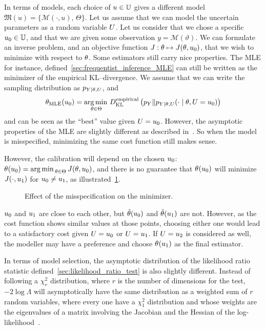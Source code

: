 \documentclass[../../Main_ManuscritThese.tex]{subfiles}
\newcommand\imgpath{/home/victor/acadwriting/Manuscrit/Text/Chapter2/img/}
\begin{document}
In terms of models, each choice of $\uu \in \Uspace$ gives a different model $\mathfrak{M}(u) = \{\mathcal{M}(\cdot, u),\,\Theta\}$. Let us assume that we can model the uncertain parameters as a random variable $\UU$.
Let us consider that we chose a specific $\uu_0 \in \Uspace$, and that we are given some observation $y=\mathscr{M}(\vartheta)$. We can formulate an inverse problem, and an objective function $J:\kk \mapsto J(\kk,\uu_0)$, that we wish to minimize with respect to $\kk$.
Some estimators still carry nice properties. The MLE for instance, defined~\cref{sec:frequentist_inference_MLE} can still be written as the minimizer of the empirical KL--divergence. We assume that we can write the sampling distribution as $p_{Y \mid \KK, \UU}$, and
\begin{equation}
  \estimtxt{\theta}{MLE}(\uu_0)=  \argmin_{\kk \in \Kspace}\DKL[empirical]{p_Y}{p_{Y \mid \theta, \UU}(\cdot \mid \theta, \UU=\uu_0)}
\end{equation}
and can be seen as the ``best'' value given $\UU=\uu_0$. However, the asymptotic properties of the MLE are slightly different as described in~\cite{white_maximum_1982}.
So when the model is misspecified, minimizing the same cost function still makes sense.

However, the calibration will depend on the chosen $\uu_0$: $\estimtxt{\theta}{}(\uu_0) = \argmin_{\theta \in \Theta} J(\theta,\uu_0)$, and there is no guarantee that $\estimtxt{\theta}{}(\uu_0)$ will minimize $J(\cdot, \uu_1)$ for $\uu_0 \neq \uu_1$, as illustrated~\cref{fig:minimizer_misspecification}.

\begin{figure}[ht]
  \centering
  
  \caption{Effect of the misspecification on the minimizer.}
  \label{fig:minimizer_misspecification}
\end{figure}

$\uu_0$ and $\uu_1$ are close to each other, but $\hat{\kk}(\uu_0)$ and $\hat{\kk}(\uu_1)$ are not. However, as the cost function shows similar values at those points, choosing either one would lead to a satisfactory cost given $\UU = \uu_0$ or $\UU=\uu_1$. If $\UU = \uu_2$ is considered as well, the modeller may have a preference and choose $\estimtxt{\kk}{}(\uu_1)$ as the final estimator.

In terms of model selection, the asymptotic distribution of the likelihood ratio statistic defined~\cref{sec:likelihood_ratio_test} is also slightly different. Instead of following a $\chi^2_{r}$ distribution, where $r$ is the number of dimensions for the test, $-2\log \Lambda$ will asymptotically have the same distribution as a weighted sum of $r$ random variables, where every one have a $\chi^2_1$ distribution and whose weights are the eigenvalues of a matrix involving the Jacobian and the Hessian of the log-likelihood~\cite{kent_robust_1982}.
\end{document}
